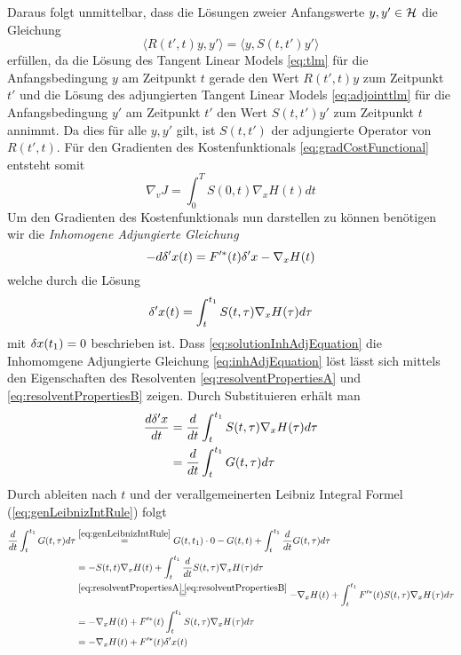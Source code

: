 Daraus folgt unmittelbar, dass die Lösungen zweier Anfangswerte $y,y' \in \mathcal{H}$ die Gleichung
\begin{equation*}
\langle R(t',t)y,y'\rangle = \langle y,S(t,t')y'\rangle 
\end{equation*}
erfüllen, da die Lösung des Tangent Linear Models \eqref{eq:tlm} für die Anfangsbedingung $y$ am Zeitpunkt $t$ gerade den Wert $R(t',t)y$ zum Zeitpunkt $t'$ und die Lösung des adjungierten Tangent Linear Models \eqref{eq:adjointtlm} für die Anfangsbedingung $y'$ am Zeitpunkt $t'$ den Wert $S(t,t')y'$ zum Zeitpunkt $t$ annimmt. Da dies für alle $y,y'$ gilt, ist $S(t,t')$ der adjungierte Operator von $R(t',t)$.
Für den Gradienten des Kostenfunktionals \eqref{eq:gradCostFunctional} entsteht somit
\begin{equation}
\label{eq:gradCostFunctionalAdjoint}
 \nabla_v J = \int_0^T S(0,t) \nabla_x H(t) dt
\end{equation}
Um den Gradienten des Kostenfunktionals nun darstellen zu können benötigen wir die \textit{Inhomogene Adjungierte Gleichung}
\begin{equation}
\label{eq:inhAdjEquation}
-d\delta'x(t) = F'^*(t)\delta'x - \nabla_x H(t)
\end{equation}
welche durch die Lösung 
\begin{equation}
\label{eq:solutionInhAdjEquation}
 \delta'x(t) = \int_t^{t_1} S(t,\tau)\nabla_x H(\tau)d\tau
\end{equation}
mit $\delta x(t_1)=0$ beschrieben ist. Dass \eqref{eq:solutionInhAdjEquation} die Inhomomgene Adjungierte Gleichung \eqref{eq:inhAdjEquation} löst lässt sich mittels den Eigenschaften des Resolventen \eqref{eq:resolventPropertiesA} und \eqref{eq:resolventPropertiesB} zeigen. Durch Substituieren erhält man
\begin{equation*}
 \begin{aligned}
  \frac{d\delta'x}{dt} &= \frac{d}{dt} \int_t^{t_1} S(t,\tau)\nabla_x H(\tau)d\tau \\
			 &= \frac{d}{dt} \int_t^{t_1} G(t,\tau)d\tau 
\end{aligned}
\end{equation*}
Durch ableiten nach $t$ und der verallgemeinerten Leibniz Integral Formel (\ref{eq:genLeibnizIntRule}) folgt
\begin{equation*}
 \begin{aligned}
 \frac{d}{dt} \int_t^{t_1} G(t,\tau)d\tau  
			 &\overset{\eqref{eq:genLeibnizIntRule}}= G(t,t_1)\cdot 0 - G(t,t) + \int_t^{t_1} \frac{d}{dt}G(t,\tau) d\tau \\
			 &= -S(t,t)\nabla_x H(t) + \int_t^{t_1} \frac{d}{dt}S(t,\tau)\nabla_x H(\tau) d\tau \\
			 &\overset{\eqref{eq:resolventPropertiesA},\eqref{eq:resolventPropertiesB}}= -\nabla_x H(t) + \int_t^{t_1} F'^*(t)S(t,\tau)\nabla_x H(\tau) d\tau \\
			  &= -\nabla_x H(t) +F'^*(t) \int_t^{t_1} S(t,\tau)\nabla_x H(\tau) d\tau \\
			 &= -\nabla_x H(t) +F'^*(t) \delta 'x(t) \\
 \end{aligned}
\end{equation*}

